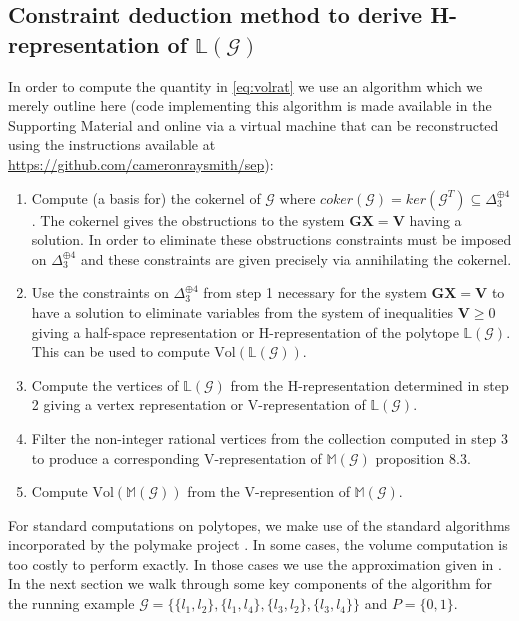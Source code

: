 \subsection{Constraint deduction method to derive H-representation of $\mathbb{L}(\mathcal{G})$}\label{sec:constraintdeductionmethod}
In order to compute the quantity in \ref{eq:volrat} we use an algorithm which we merely outline here (code implementing this algorithm is made available in the Supporting Material and online via a virtual machine that can be reconstructed using the instructions available at \\ \href{https://github.com/cameronraysmith/sep}{https://github.com/cameronraysmith/sep}):
\begin{enumerate}
\item Compute (a basis for) the cokernel of $\mathcal{G}$ where $coker(\mathcal{G}) = ker(\mathcal{G}^T) \subseteq \Delta_3^{\oplus 4}$. The cokernel gives the obstructions to the system $\mathbf{G}\mathbf{X}=\mathbf{V}$ having a solution. In order to eliminate these obstructions constraints must be imposed on $\Delta_3^{\oplus 4}$ and these constraints are given precisely via annihilating the cokernel.
\item Use the constraints on $\Delta_3^{\oplus 4}$ from step 1 necessary for the system $\mathbf{G}\mathbf{X}=\mathbf{V}$ to have a solution to eliminate variables from the system of inequalities $\mathbf{V} \geq 0$ giving a half-space representation or H-representation of the polytope $\mathbb{L}(\mathcal{G})$. This can be used to compute $\text{Vol}(\mathbb{L}(\mathcal{G}))$.
\item Compute the vertices of $\mathbb{L}(\mathcal{G})$ from the H-representation determined in step 2 giving a vertex representation or V-representation of $\mathbb{L}(\mathcal{G})$.
\item Filter the non-integer rational vertices from the collection computed in step 3 to produce a corresponding V-representation of $\mathbb{M}(\mathcal{G})$ \cite{Wainwright2007} proposition 8.3.
\item Compute $\text{Vol}(\mathbb{M}(\mathcal{G}))$ from the V-represention of $\mathbb{M}(\mathcal{G})$.
\end{enumerate}
For standard computations on polytopes, we make use of the standard algorithms incorporated by the polymake project \cite{Gawrilow2000}. In some cases, the volume computation is too costly to perform exactly. In those cases we use the approximation given in \cite{Cousins}. In the next section we walk through some key components of the algorithm for the running example $\mathcal{G} = \{\{l_1,l_2 \},\{l_1,l_4 \},\{l_3,l_2\},\{l_3,l_4\} \}$ and $P=\{0,1\}$.

